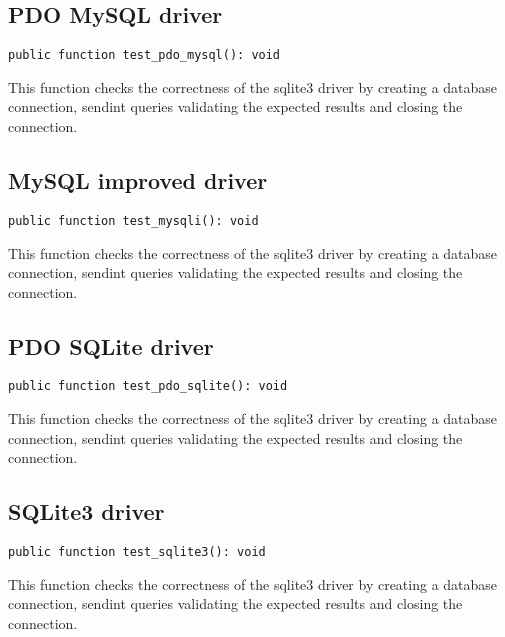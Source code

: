 \documentclass[a4paper]{book}
\begin{document}
\hypertarget{toc47}{}
\subsection{PDO MySQL driver}

\begin{lstlisting}
public function test_pdo_mysql(): void
\end{lstlisting}

This function checks the correctness of the sqlite3 driver by creating a
database connection, sendint queries validating the expected results and
closing the connection.

\hypertarget{toc48}{}
\subsection{MySQL improved driver}

\begin{lstlisting}
public function test_mysqli(): void
\end{lstlisting}

This function checks the correctness of the sqlite3 driver by creating a
database connection, sendint queries validating the expected results and
closing the connection.

\hypertarget{toc49}{}
\subsection{PDO SQLite driver}

\begin{lstlisting}
public function test_pdo_sqlite(): void
\end{lstlisting}

This function checks the correctness of the sqlite3 driver by creating a
database connection, sendint queries validating the expected results and
closing the connection.

\hypertarget{toc50}{}
\subsection{SQLite3 driver}

\begin{lstlisting}
public function test_sqlite3(): void
\end{lstlisting}

This function checks the correctness of the sqlite3 driver by creating a
database connection, sendint queries validating the expected results and
closing the connection.
\end{document}
